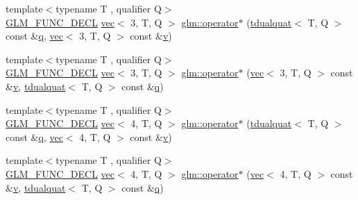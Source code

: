 \begin{DoxyCompactItemize}
\item 
{\footnotesize template$<$typename T , qualifier Q$>$ }\\\hyperlink{setup_8hpp_ab2d052de21a70539923e9bcbf6e83a51}{G\+L\+M\+\_\+\+F\+U\+N\+C\+\_\+\+D\+E\+CL} \hyperlink{structglm_1_1vec}{vec}$<$ 3, T, Q $>$ \hyperlink{group__gtx__dual__quaternion_ga3489c5fcf23fd302ef3713f443585cbd}{glm\+::operator$\ast$} (\hyperlink{structglm_1_1tdualquat}{tdualquat}$<$ T, Q $>$ const \&\hyperlink{_s_d_l__opengl_8h_a8fc1e7b9baaae687804c7eed46ca09c6}{q}, \hyperlink{structglm_1_1vec}{vec}$<$ 3, T, Q $>$ const \&\hyperlink{_s_d_l__opengl_8h_a10a82eabcb59d2fcd74acee063775f90}{v})
\item 
{\footnotesize template$<$typename T , qualifier Q$>$ }\\\hyperlink{setup_8hpp_ab2d052de21a70539923e9bcbf6e83a51}{G\+L\+M\+\_\+\+F\+U\+N\+C\+\_\+\+D\+E\+CL} \hyperlink{structglm_1_1vec}{vec}$<$ 3, T, Q $>$ \hyperlink{group__gtx__dual__quaternion_ga84dc00cb210525a28d3a185c9a0ba176}{glm\+::operator$\ast$} (\hyperlink{structglm_1_1vec}{vec}$<$ 3, T, Q $>$ const \&\hyperlink{_s_d_l__opengl_8h_a10a82eabcb59d2fcd74acee063775f90}{v}, \hyperlink{structglm_1_1tdualquat}{tdualquat}$<$ T, Q $>$ const \&\hyperlink{_s_d_l__opengl_8h_a8fc1e7b9baaae687804c7eed46ca09c6}{q})
\item 
{\footnotesize template$<$typename T , qualifier Q$>$ }\\\hyperlink{setup_8hpp_ab2d052de21a70539923e9bcbf6e83a51}{G\+L\+M\+\_\+\+F\+U\+N\+C\+\_\+\+D\+E\+CL} \hyperlink{structglm_1_1vec}{vec}$<$ 4, T, Q $>$ \hyperlink{group__gtx__dual__quaternion_ga5e415497e00977106ec263f86b61e84c}{glm\+::operator$\ast$} (\hyperlink{structglm_1_1tdualquat}{tdualquat}$<$ T, Q $>$ const \&\hyperlink{_s_d_l__opengl_8h_a8fc1e7b9baaae687804c7eed46ca09c6}{q}, \hyperlink{structglm_1_1vec}{vec}$<$ 4, T, Q $>$ const \&\hyperlink{_s_d_l__opengl_8h_a10a82eabcb59d2fcd74acee063775f90}{v})
\item 
{\footnotesize template$<$typename T , qualifier Q$>$ }\\\hyperlink{setup_8hpp_ab2d052de21a70539923e9bcbf6e83a51}{G\+L\+M\+\_\+\+F\+U\+N\+C\+\_\+\+D\+E\+CL} \hyperlink{structglm_1_1vec}{vec}$<$ 4, T, Q $>$ \hyperlink{group__gtx__dual__quaternion_ga9fd4e646fe49daed7aabbf0cb8736685}{glm\+::operator$\ast$} (\hyperlink{structglm_1_1vec}{vec}$<$ 4, T, Q $>$ const \&\hyperlink{_s_d_l__opengl_8h_a10a82eabcb59d2fcd74acee063775f90}{v}, \hyperlink{structglm_1_1tdualquat}{tdualquat}$<$ T, Q $>$ const \&\hyperlink{_s_d_l__opengl_8h_a8fc1e7b9baaae687804c7eed46ca09c6}{q})

\end{DoxyCompactItemize}
